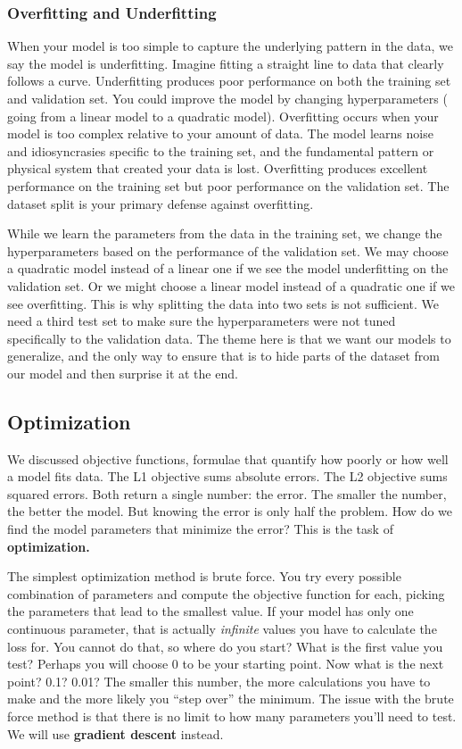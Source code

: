 \subsubsection*{Overfitting and Underfitting}
When your model is too simple to capture the underlying pattern in the data, we say the model is underfitting. Imagine fitting a straight line to data that clearly follows a curve. Underfitting produces poor performance on both the training set and validation set. You could improve the model by changing hyperparameters (\eg{} going from a linear model to a quadratic model). Overfitting occurs when your model is too complex relative to your amount of data. The model learns noise and idiosyncrasies specific to the training set, and the fundamental pattern or physical system that created your data is lost. Overfitting produces excellent performance on the training set but poor performance on the validation set. The dataset split is your primary defense against overfitting.

While we learn the parameters from the data in the training set, we change the hyperparameters based on the performance of the validation set. We may choose a quadratic model instead of a linear one if we see the model underfitting on the validation set. Or we might choose a linear model instead of a quadratic one if we see overfitting. This is why splitting the data into two sets is not sufficient. We need a third test set to make sure the hyperparameters were not tuned specifically to the validation data. The theme here is that we want our models to generalize, and the only way to ensure that is to hide parts of the dataset from our model and then surprise it at the end.

\subsection*{Optimization}
We discussed objective functions, formulae that quantify how poorly or how well a model fits data. The L1 objective sums absolute errors. The L2 objective sums squared errors. Both return a single number: the error. The smaller the number, the better the model. But knowing the error is only half the problem. How do we find the model parameters that minimize the error? This is the task of \textbf{optimization.}

The simplest optimization method is brute force. You try every possible combination of parameters and compute the objective function for each, picking the parameters that lead to the smallest value. If your model has only one continuous parameter, that is actually \emph{infinite} values you have to calculate the loss for. You cannot do that, so where do you start? What is the first value you test? Perhaps you will choose 0 to be your starting point. Now what is the next point? 0.1? 0.01? The smaller this number, the more calculations you have to make and the more likely you ``step over'' the minimum. The issue with the brute force method is that there is no limit to how many parameters you'll need to test. We will use \textbf{gradient descent} instead.

